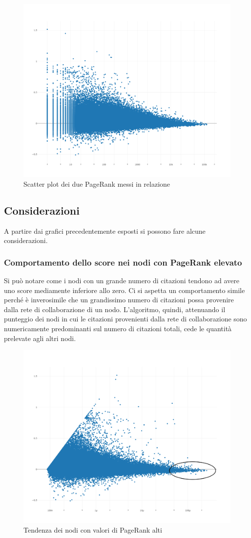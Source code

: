 \documentclass[a4paper, 12pt]{article}
\begin{document}
\begin{figure}[H]
  \includegraphics[width=\linewidth]{images/grafico-3.png}
  \caption{Scatter plot dei due PageRank messi in relazione}
\end{figure}

\subsection{Considerazioni}
A partire dai grafici precedentemente esposti si possono fare alcune considerazioni.
\par
\subsubsection{Comportamento dello score nei nodi con PageRank elevato}
Si può notare come i nodi con un grande numero di citazioni tendono ad avere uno score mediamente inferiore allo zero. Ci si aspetta un comportamento simile perché è inverosimile che un grandissimo numero di citazioni possa provenire dalla rete di collaborazione di un nodo. L'algoritmo, quindi, attenuando il punteggio dei nodi in cui le citazioni provenienti dalla rete di collaborazione sono numericamente predominanti sul numero di citazioni totali, cede le quantità prelevate agli altri nodi.
\begin{figure}[H]
  \includegraphics[width=0.6\linewidth]{images/grafico-4.png}
  \caption{Tendenza dei nodi con valori di PageRank alti}
\end{figure}
\end{document}
